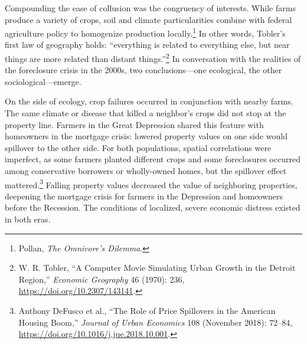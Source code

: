 \documentclass[12pt,oneside]{psthesis}
\begin{document}
Compounding the ease of collusion was the congruency of interests.
While farms produce a variety of crops, soil and climate particularities combine with federal agriculture policy to homogenize production locally.\footnote{Pollan, \emph{The Omnivore's Dilemma}.}
In other words, Tobler's first law of geography holds: ``everything is related to everything else, but near things are more related than distant things.''\footnote{W. R. Tobler, ``A Computer Movie Simulating Urban Growth in the Detroit Region,'' \emph{Economic Geography} 46 (1970): 236, \url{https://doi.org/10.2307/143141}.}
In conversation with the realities of the foreclosure crisis in the 2000s, two conclusions---one ecological, the other sociological---emerge.

On the side of ecology, crop failures occurred in conjunction with nearby farms.
The same climate or disease that killed a neighbor's crops did not stop at the property line.
Farmers in the Great Depression shared this feature with homeowners in the mortgage crisis: lowered property values on one side would spillover to the other side.
For both populations, spatial correlations were imperfect, as some farmers planted different crops and some foreclosures occurred among conservative borrowers or wholly-owned homes, but the spillover effect mattered.\footnote{Anthony DeFusco et al., ``The Role of Price Spillovers in the American Housing Boom,'' \emph{Journal of Urban Economics} 108 (November 2018): 72--84, \url{https://doi.org/10.1016/j.jue.2018.10.001}.}
Falling property values decreased the value of neighboring properties, deepening the mortgage crisis for farmers in the Depression and homeowners before the Recession.
The conditions of localized, severe economic distress existed in both eras.
\end{document}
